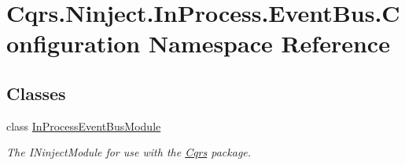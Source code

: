 \hypertarget{namespaceCqrs_1_1Ninject_1_1InProcess_1_1EventBus_1_1Configuration}{}\section{Cqrs.\+Ninject.\+In\+Process.\+Event\+Bus.\+Configuration Namespace Reference}
\label{namespaceCqrs_1_1Ninject_1_1InProcess_1_1EventBus_1_1Configuration}
\subsection*{Classes}
\begin{DoxyCompactItemize}
\item 
class \hyperlink{classCqrs_1_1Ninject_1_1InProcess_1_1EventBus_1_1Configuration_1_1InProcessEventBusModule}{In\+Process\+Event\+Bus\+Module}
\begin{DoxyCompactList}\small\item\em The I\+Ninject\+Module for use with the \hyperlink{namespaceCqrs}{Cqrs} package. \end{DoxyCompactList}\end{DoxyCompactItemize}
